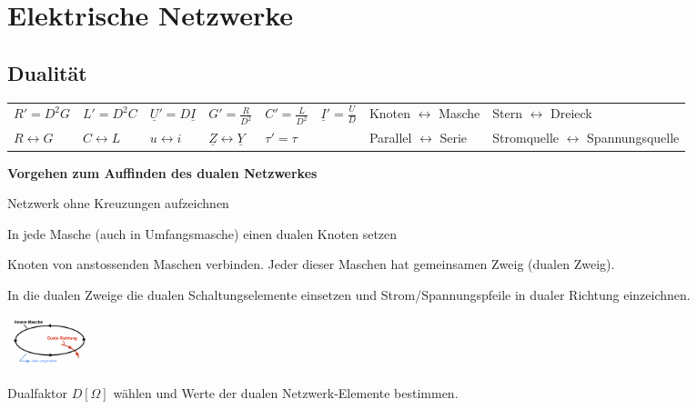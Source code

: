 \section{Elektrische Netzwerke}
\subsection{Dualität}
\begin{tabular}{llllllll}
$R'=D^2G$ & $L'=D^2C$ & $\underline{U}'=D\underline{I}$ & $G'=\frac{R}{D^2}$ &
$C'=\frac{L}{D^2}$ & $\underline{I}'=\frac{\underline{U}}{D}$ & Knoten $\leftrightarrow$
Masche & Stern $\leftrightarrow$ Dreieck \\
$R \leftrightarrow G $ & $C \leftrightarrow L$ & $u \leftrightarrow i$ &
$\underline{Z} \leftrightarrow \underline{Y}$ & $\tau' = \tau$ & & Parallel $\leftrightarrow$
Serie & Stromquelle $\leftrightarrow$ Spannungsquelle\\
\end{tabular}

\textbf{Vorgehen zum Auffinden des dualen Netzwerkes}
\begin{enumerate}[itemsep=1ex, nosep]
	\item Netzwerk ohne Kreuzungen aufzeichnen
	\item In jede Masche (auch in Umfangsmasche) einen dualen Knoten setzen
	\item Knoten von anstossenden Maschen verbinden. Jeder dieser Maschen hat
	gemeinsamen Zweig (dualen Zweig).\\
	\begin{minipage}{14cm}
		\item In die dualen Zweige die dualen Schaltungselemente einsetzen und Strom/Spannungspfeile in dualer Richtung einzeichnen.
	\end{minipage}
	\parbox[c]{2.5cm}{
		\includegraphics[width = 2.5cm]{./bilder/Duale_Richtung}}
	\item Dualfaktor $D [\Omega]$ wählen und Werte der dualen Netzwerk-Elemente
	bestimmen.
	
\end{enumerate}

